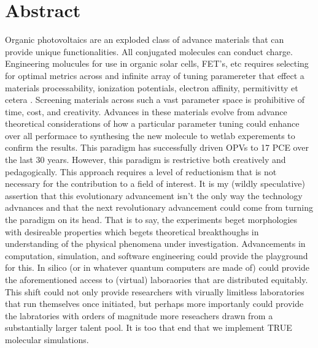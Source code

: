 
\chapter*{Abstract}

Organic photovoltaics are an exploded  class of advance materials that can provide unique functionalities.
All conjugated molecules can conduct charge. 
Engineering molucules for use in organic solar cells, FET's, etc 
requires selecting for optimal metrics across and infinite array of tuning paramereter that effect a materials
processability, ionization potentials, electron affinity, permitivitty et cetera . 
Screening materials across
such a vast parameter space is prohibitive of time, cost, and creativity. Advances in these materials evolve
from advance theoretical considerations of how a particular parameter tuning could enhance over all performace
to synthesing the new molecule to wetlab experements to confirm the results. This paradigm has successfully
driven OPVs to 17 PCE over the last 30 years. However, this paradigm is restrictive both creatively and
pedagogically. This approach requires a level of reductionism that is not necessary for the contribution to a
field of interest. It is my (wildly speculative) assertion that this evolutionary advancement isn't the only
way the technology advnances and that the next revolutionary advancement could come from turning the paradigm
on its head. That is to say, the experiments beget morphologies with desireable properties which begets
theoretical breakthoughs in understanding of the physical phenomena under investigation. Advancements in
computation, simulation, and software engineering could provide the playground for this. In silico (or in
whatever quantum computers are made of) could provide the aforementioned access to (virtual) laboraories that
are distributed equitably. This shift could not only provide researchers with virually limitless 
laboratories that run themselves once initiated, but perhaps more importanly could provide the labratories
with orders of magnitude more reseachers drawn from a substantially larger talent pool. It is too that end
that we implement TRUE molecular simulations.    


